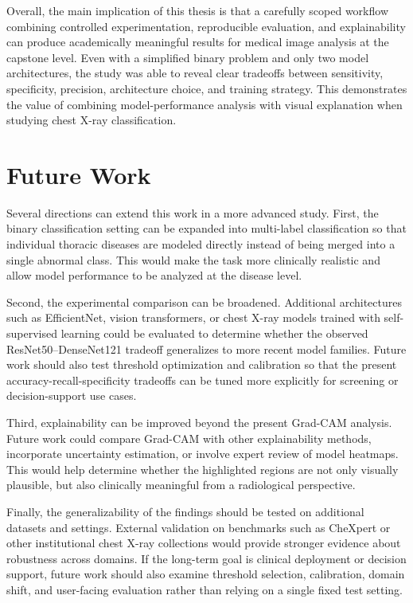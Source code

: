 Overall, the main implication of this thesis is that a carefully scoped workflow combining controlled experimentation, reproducible evaluation, and explainability can produce academically meaningful results for medical image analysis at the capstone level. Even with a simplified binary problem and only two model architectures, the study was able to reveal clear tradeoffs between sensitivity, specificity, precision, architecture choice, and training strategy. This demonstrates the value of combining model-performance analysis with visual explanation when studying chest X-ray classification.

\section{Future Work}
Several directions can extend this work in a more advanced study. First, the binary classification setting can be expanded into multi-label classification so that individual thoracic diseases are modeled directly instead of being merged into a single abnormal class. This would make the task more clinically realistic and allow model performance to be analyzed at the disease level.

Second, the experimental comparison can be broadened. Additional architectures such as EfficientNet, vision transformers, or chest X-ray models trained with self-supervised learning could be evaluated to determine whether the observed ResNet50--DenseNet121 tradeoff generalizes to more recent model families. Future work should also test threshold optimization and calibration so that the present accuracy-recall-specificity tradeoffs can be tuned more explicitly for screening or decision-support use cases.

Third, explainability can be improved beyond the present Grad-CAM analysis. Future work could compare Grad-CAM with other explainability methods, incorporate uncertainty estimation, or involve expert review of model heatmaps. This would help determine whether the highlighted regions are not only visually plausible, but also clinically meaningful from a radiological perspective.

Finally, the generalizability of the findings should be tested on additional datasets and settings. External validation on benchmarks such as CheXpert or other institutional chest X-ray collections would provide stronger evidence about robustness across domains. If the long-term goal is clinical deployment or decision support, future work should also examine threshold selection, calibration, domain shift, and user-facing evaluation rather than relying on a single fixed test setting.
